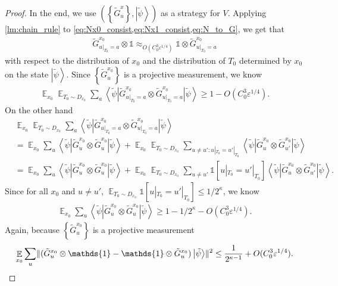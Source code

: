 \documentclass[10pt,a4paper]{article}
\theoremstyle{plain}
\theoremstyle{definition}
\newcommand {\set} [1] {\ensuremath{ \left\lbrace #1 \right\rbrace }}
\DeclarePairedDelimiter{\norm}{\lVert}{\rVert}
\newcommand {\bra} [1] {\ensuremath{ \left\langle #1 \right| }}
\newcommand {\ket} [1] {\ensuremath{ \left| #1 \right\rangle }}
\DeclareMathOperator*{\bigE}{\mathbb{E}}
\newcommand {\id} {\ensuremath{\mathds{1}}}
\newcommand{\ep} {\ensuremath{\varepsilon}}
\newcommand{\x}{\otimes}
\newcommand{\appd}[1]{\approx_{#1}}
\newcommand{\1}{\mathbb{1}} %
\newcommand{\tG}{\tilde{G}}
\newcommand{\tpsi}{\tilde{\psi}}
\begin{document}
\begin{proof}
In the end, we use $(\set{ \tG^x_u }, \ket{\tpsi})$ as a strategy for $V$.
Applying \cref{lm:chain_rule} to \cref{eq:Nx0_consist,eq:Nx1_consist,eq:N_to_G}, we get that 
\begin{align*}
	\tG^{x_0}_{u|_{T_0}=a} \x \id \appd{O(C_0^3\ep^{1/4})} \id \x \tG^{x_0}_{u|_{T_0}= a}
\end{align*}
with respect to the distribution of $x_0$ and the distribution of $T_0$ determined by $x_0$ on the state $\ket{\tpsi}$.
Since $\set{ \tG^{x_0}_u }$ is a projective measurement, we know
\begin{align*}
	\bigE_{x_0} \bigE_{T_0 \sim D_{x_0}} \sum_a \bra{\tpsi} \tG^{x_0}_{u|_{T_0} = a} \x \tG^{x_0}_{u|_{T_0} = a} \ket{\tpsi} \geq 1 - O(C_0^3\ep^{1/4}).
\end{align*}
On the other hand
\begin{align*}
	&\bigE_{x_0} \bigE_{T_0 \sim D_{x_0}} \sum_a \bra{\tpsi} \tG^{x_0}_{u|_{T_0} = a} \x \tG^{x_0}_{u|_{T_0} = a} \ket{\tpsi} \\
	&= \bigE_{x_0} \sum_u \bra{\tpsi} \tG^{x_0}_{u} \x \tG^{x_0}_{u} \ket{\tpsi} 
	+ \bigE_{x_0} \bigE_{T_0\sim D_{x_0}} \sum_{u\neq u': u|_{T_0} = u'|_{T_0}} \bra{\tpsi} \tG^{x_0}_{u} \x \tG^{x_0}_{u'} \ket{\tpsi} \\
	&= \bigE_{x_0} \sum_u \bra{\tpsi} \tG^{x_0}_{u} \x \tG^{x_0}_{u} \ket{\tpsi} + 
	\bigE_{x_0} \bigE_{T_0\sim D_{x_0}} \sum_{u \neq u'} \id[u|_{T_0} = u'|_{T_0}] \bra{\tpsi} \tG^{x_0}_{u} \x \tG^{x_0}_{u'} \ket{\tpsi}.
\end{align*}
Since for all $x_0$ and $u \neq u'$, $\bigE_{T_0\sim D_{x_0}}\id[u|_{T_0} = u'|_{T_0}] \leq 1/2^\kappa$, we know
\begin{align*}
	 \bigE_{x_0} \sum_u \bra{\tpsi} \tG^{x_0}_{u} \x \tG^{x_0}_{u} \ket{\tpsi} \geq 1 - 1/2^\kappa - O(C_0^3\ep^{1/4}).
\end{align*}
Again, because $\set{\tG^{x_0}_u}$ is a projective measurement 
\begin{align*}
	\bigE_{x_0} \sum_u \norm{ (\tG^{x_0}_u \x \id - \id \x \tG^{x_0}_u) \ket{\tpsi}}^2 \leq \frac{1}{2^{\kappa-1}} + O(C_0^3\ep^{1/4}).
\end{align*}


\end{proof}
\end{document}
